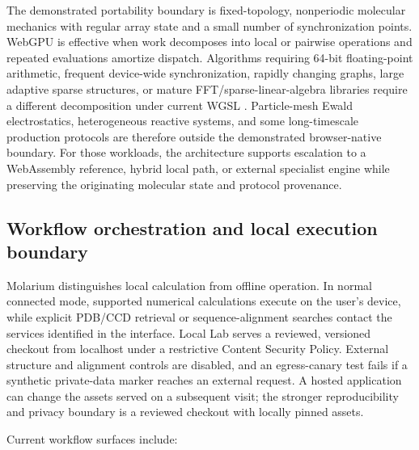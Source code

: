 \documentclass[11pt]{article}
\begin{document}
\begin{small}
The demonstrated portability boundary is fixed-topology, nonperiodic molecular mechanics with regular array state and a small number of synchronization points. WebGPU is effective when work decomposes into local or pairwise operations and repeated evaluations amortize dispatch. Algorithms requiring 64-bit floating-point arithmetic, frequent device-wide synchronization, rapidly changing graphs, large adaptive sparse structures, or mature FFT/sparse-linear-algebra libraries require a different decomposition under current WGSL \citep{webgpuWGSL2026}. Particle-mesh Ewald electrostatics, heterogeneous reactive systems, and some long-timescale production protocols are therefore outside the demonstrated browser-native boundary. For those workloads, the architecture supports escalation to a WebAssembly reference, hybrid local path, or external specialist engine while preserving the originating molecular state and protocol provenance.

\subsection{Workflow orchestration and local execution boundary}

Molarium distinguishes local calculation from offline operation. In normal connected mode, supported numerical calculations execute on the user's device, while explicit PDB/CCD retrieval or sequence-alignment searches contact the services identified in the interface. Local Lab serves a reviewed, versioned checkout from localhost under a restrictive Content Security Policy. External structure and alignment controls are disabled, and an egress-canary test fails if a synthetic private-data marker reaches an external request. A hosted application can change the assets served on a subsequent visit; the stronger reproducibility and privacy boundary is a reviewed checkout with locally pinned assets.

Current workflow surfaces include:


\end{small}
\end{document}
